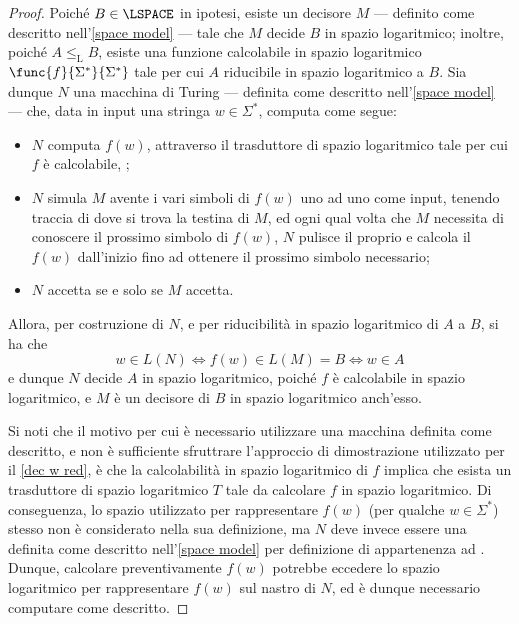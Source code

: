 \documentclass[a4paper, 12pt]{report}
\begin{document}
    \begin{proof}
        Poiché $B \in \LSPACE$ in ipotesi, esiste un decisore $M$ --- definito come descritto nell'\cref{space model} --- tale che $M$ decide $B$ in spazio logaritmico; inoltre, poiché $A \leq_\mathrm L B$, esiste una funzione calcolabile in spazio logaritmico $\func{f}{\Sigma^*}{\Sigma^*}$ tale per cui $A$ riducibile in spazio logaritmico a $B$. Sia dunque $N$ una macchina di Turing --- definita come descritto nell'\cref{space model} --- che, data in input una stringa $w \in \Sigma^*$, computa come segue:

        \begin{itemize}
            \item $N$ computa $f(w)$, attraverso il trasduttore di spazio logaritmico tale per cui $f$ è calcolabile, ;
            \item $N$ simula $M$ avente i vari simboli di $f(w)$ uno ad uno come input, tenendo traccia di dove si trova la testina di $M$, ed ogni qual volta che $M$ necessita di conoscere il prossimo simbolo di $f(w)$, $N$ pulisce il proprio  e calcola il $f(w)$ dall'inizio fino ad ottenere il prossimo simbolo necessario;
            \item $N$ accetta se e solo se $M$ accetta.
        \end{itemize}

        Allora, per costruzione di $N$, e per riducibilità in spazio logaritmico di $A$ a $B$, si ha che $$w \in L(N) \iff f(w) \in L(M) = B \iff w \in A$$ e dunque $N$ decide $A$ in spazio logaritmico, poiché $f$ è calcolabile in spazio logaritmico, e $M$ è un decisore di $B$ in spazio logaritmico anch'esso.

        Si noti che il motivo per cui è necessario utilizzare una macchina definita come descritto, e non è sufficiente sfruttrare l'approccio di dimostrazione utilizzato per il \cref{dec w red}, è che la calcolabilità in spazio logaritmico di $f$ implica che esista un trasduttore di spazio logaritmico $T$ tale da calcolare $f$ in spazio logaritmico. Di conseguenza, lo spazio utilizzato per rappresentare $f(w)$ (per qualche $w \in \Sigma^*$) stesso non è considerato nella sua definizione, ma $N$ deve invece essere una \TM definita come descritto nell'\cref{space model} per definizione di appartenenza ad \LSPACE. Dunque, calcolare preventivamente $f(w)$ potrebbe eccedere lo spazio logaritmico per rappresentare $f(w)$ sul nastro di $N$, ed è dunque necessario computare come descritto.
    \end{proof}
\end{document}
